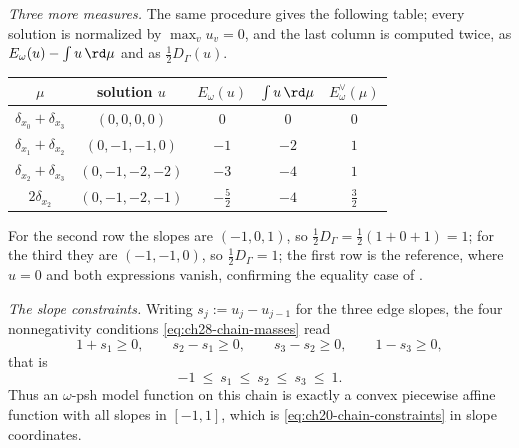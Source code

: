 \begin{example}[{The chain \(\Gamma=[0,3]\): a solved equation, verified}]
\emph{Three more measures.}  The same procedure gives the following table;
every solution is normalized by \(\max_vu_v=0\), and the last column is
computed twice, as \(E_\omega(u)-\int u\,\rd\mu\) and as
\(\tfrac12D_\Gamma(u)\).
\begin{center}
\small
\begin{tabular}{c|c|c|c|c}
\toprule
\(\mu\)&solution \(u\)&\(E_\omega(u)\)&\(\int u\,\rd\mu\)
 &\(E^\vee_\omega(\mu)\)\\
\midrule
\(\delta_{x_0}+\delta_{x_3}\)&\((0,0,0,0)\)&\(0\)&\(0\)&\(0\)\\
\(\delta_{x_1}+\delta_{x_2}\)&\((0,-1,-1,0)\)&\(-1\)&\(-2\)&\(1\)\\
\(\delta_{x_2}+\delta_{x_3}\)&\((0,-1,-2,-2)\)&\(-3\)&\(-4\)&\(1\)\\
\(2\delta_{x_2}\)&\((0,-1,-2,-1)\)&\(-\tfrac52\)&\(-4\)&\(\tfrac32\)\\
\bottomrule
\end{tabular}
\end{center}
For the second row the slopes are \((-1,0,1)\), so
\(\tfrac12D_\Gamma=\tfrac12(1+0+1)=1\); for the third they are
\((-1,-1,0)\), so \(\tfrac12D_\Gamma=1\); the first row is the reference,
where \(u=0\) and both expressions vanish, confirming the equality case of
.

\emph{The slope constraints.}  Writing \(s_j:=u_j-u_{j-1}\) for the three
edge slopes, the four nonnegativity conditions
\eqref{eq:ch28-chain-masses} read
\[
 1+s_1\geq0,\qquad s_2-s_1\geq0,\qquad s_3-s_2\geq0,\qquad 1-s_3\geq0 ,
\]
that is
\begin{equation}
\label{eq:ch28-chain-slope-window}
 -1\ \leq\ s_1\ \leq\ s_2\ \leq\ s_3\ \leq\ 1 .
\end{equation}
Thus an \(\omega\)-psh model function on this chain is exactly a convex
piecewise affine function with all slopes in \([-1,1]\), which is
\eqref{eq:ch20-chain-constraints} in slope coordinates.


\end{example}
